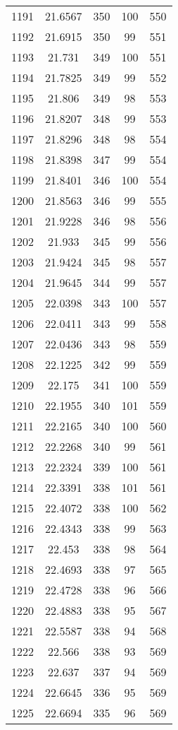 \documentclass[12pt,a4paper]{article}
\begin{document}
\begin{tabular}{r|cccc}
	1191 & 21.6567 & 350 & 100 & 550 \\
	1192 & 21.6915 & 350 & 99 & 551 \\
	1193 & 21.731 & 349 & 100 & 551 \\
	1194 & 21.7825 & 349 & 99 & 552 \\
	1195 & 21.806 & 349 & 98 & 553 \\
	1196 & 21.8207 & 348 & 99 & 553 \\
	1197 & 21.8296 & 348 & 98 & 554 \\
	1198 & 21.8398 & 347 & 99 & 554 \\
	1199 & 21.8401 & 346 & 100 & 554 \\
	1200 & 21.8563 & 346 & 99 & 555 \\
	1201 & 21.9228 & 346 & 98 & 556 \\
	1202 & 21.933 & 345 & 99 & 556 \\
	1203 & 21.9424 & 345 & 98 & 557 \\
	1204 & 21.9645 & 344 & 99 & 557 \\
	1205 & 22.0398 & 343 & 100 & 557 \\
	1206 & 22.0411 & 343 & 99 & 558 \\
	1207 & 22.0436 & 343 & 98 & 559 \\
	1208 & 22.1225 & 342 & 99 & 559 \\
	1209 & 22.175 & 341 & 100 & 559 \\
	1210 & 22.1955 & 340 & 101 & 559 \\
	1211 & 22.2165 & 340 & 100 & 560 \\
	1212 & 22.2268 & 340 & 99 & 561 \\
	1213 & 22.2324 & 339 & 100 & 561 \\
	1214 & 22.3391 & 338 & 101 & 561 \\
	1215 & 22.4072 & 338 & 100 & 562 \\
	1216 & 22.4343 & 338 & 99 & 563 \\
	1217 & 22.453 & 338 & 98 & 564 \\
	1218 & 22.4693 & 338 & 97 & 565 \\
	1219 & 22.4728 & 338 & 96 & 566 \\
	1220 & 22.4883 & 338 & 95 & 567 \\
	1221 & 22.5587 & 338 & 94 & 568 \\
	1222 & 22.566 & 338 & 93 & 569 \\
	1223 & 22.637 & 337 & 94 & 569 \\
	1224 & 22.6645 & 336 & 95 & 569 \\
	1225 & 22.6694 & 335 & 96 & 569 \\

\end{tabular}
\end{document}
